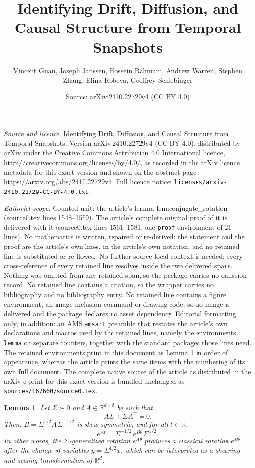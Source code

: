 \documentclass[10pt,a4paper]{amsart}
\title{Identifying Drift, Diffusion, and Causal Structure from Temporal Snapshots}
\author{Vincent Guan, Joseph Janssen, Hossein Rahmani, Andrew Warren, Stephen Zhang, Elina Robeva, Geoffrey Schiebinger}
\date{Source: arXiv:2410.22729v4 (CC BY 4.0)}
\newtheorem{lemma}{Lemma}
\newcommand{\R} {\mathbb R}
\begin{document}
\maketitle

\noindent\emph{Source and licence.} Identifying Drift, Diffusion, and Causal Structure from Temporal Snapshots. Version arXiv:2410.22729v4 (CC BY 4.0), distributed by arXiv under the Creative Commons Attribution 4.0 International licence, http://creativecommons.org/licenses/by/4.0/, as recorded in the arXiv licence metadata for this exact version and shown on the abstract page https://arxiv.org/abs/2410.22729v4. Full licence notice: \texttt{licenses/arxiv-2410.22729-CC-BY-4.0.txt}.\par\smallskip

\noindent\textit{Editorial scope.} Counted unit: the article's lemma lem:conjugate\_rotation (source0.tex lines 1548--1559). The article's complete original proof of it is delivered with it (source0.tex lines 1561--1581, one \texttt{proof} environment of 21 lines). No mathematics is written, repaired or re-derived: the statement and the proof are the article's own lines, in the article's own notation, and no retained line is substituted or re-flowed.  No further source-local context is needed: every cross-reference of every retained line resolves inside the two delivered spans.  Nothing was omitted from any retained span, so the package carries no omission record.  No retained line contains a citation, so the wrapper carries no bibliography and no bibliography entry.  No retained line contains a figure environment, an image-inclusion command or drawing code, so no image is delivered and the package declares no asset dependency.  Editorial formatting only, in addition: an AMS \texttt{amsart} preamble that restates the article's own declarations and macros used by the retained lines, namely the environments \texttt{lemma} on separate counters, together with the standard packages those lines need.  The retained environments print in this document as Lemma 1 in order of appearance, whereas the article prints the same items with the numbering of its own full document.  The complete native source of the article as distributed in the arXiv e-print for this exact version is bundled unchanged as \texttt{sources/167660/source0.tex}.
\begin{lemma}
Let \(\Sigma \succ 0\) and \(A \in \R^{d \times d}\) be such that
\[
A\Sigma + \Sigma A^\top  = 0.
\]
Then, $B = \Sigma^{1/2} A\,\Sigma^{-1/2}$  is skew-symmetric, and for all \(t\in\R\),
\[
e^{At} = \Sigma^{-1/2}\,e^{B\theta}\,\Sigma^{1/2}.
\]
In other words, the $\Sigma$-generalized rotation \(e^{A\theta}\) produces a classical rotation \(e^{B\theta}\) after the change of variables \(y = \Sigma^{1/2}x\), which can be interpreted as a shearing and scaling transformation of $\R^d$.
\label{lem:conjugate_rotation}
\end{lemma}
\end{document}
